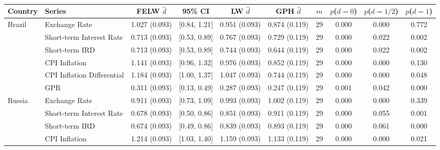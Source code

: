 \begin{table}[!htbp]
\fontsize{6}{7}\selectfont
\caption{}
\centering
\begin{adjustbox}{width=\textwidth}
\begin{tabular}{llcccccccc}
\hline
Country & Series & FELW $\hat{d}$ & 95\% CI & LW $\hat{d}$ & GPH $\hat{d}$ & $m$ & $p$($d=0$) & $p$($d=1/2$) & $p$($d=1$) \\ \hline
Brazil & Exchange Rate & 1.027 (0.093) & [0.84, 1.21] & 0.951 (0.093) & 0.874 (0.119) & 29 & 0.000 & 0.000 & 0.772 \\
 & Short-term Interest Rate & 0.713 (0.093) & [0.53, 0.89] & 0.767 (0.093) & 0.729 (0.119) & 29 & 0.000 & 0.022 & 0.002 \\
 & Short-term IRD & 0.713 (0.093) & [0.53, 0.89] & 0.744 (0.093) & 0.644 (0.119) & 29 & 0.000 & 0.022 & 0.002 \\
 & CPI Inflation & 1.141 (0.093) & [0.96, 1.32] & 0.976 (0.093) & 0.852 (0.119) & 29 & 0.000 & 0.000 & 0.130 \\
 & CPI Inflation Differential & 1.184 (0.093) & [1.00, 1.37] & 1.047 (0.093) & 0.744 (0.119) & 29 & 0.000 & 0.000 & 0.048 \\
 & GPR & 0.311 (0.093) & [0.13, 0.49] & 0.287 (0.093) & 0.247 (0.119) & 29 & 0.001 & 0.042 & 0.000 \\
\hline
Russia & Exchange Rate & 0.911 (0.093) & [0.73, 1.09] & 0.993 (0.093) & 1.002 (0.119) & 29 & 0.000 & 0.000 & 0.339 \\
 & Short-term Interest Rate & 0.678 (0.093) & [0.50, 0.86] & 0.851 (0.093) & 0.911 (0.119) & 29 & 0.000 & 0.055 & 0.001 \\
 & Short-term IRD & 0.674 (0.093) & [0.49, 0.86] & 0.839 (0.093) & 0.893 (0.119) & 29 & 0.000 & 0.061 & 0.000 \\
 & CPI Inflation & 1.214 (0.093) & [1.03, 1.40] & 1.159 (0.093) & 1.133 (0.119) & 29 & 0.000 & 0.000 & 0.021 \\

\end{tabular}
\end{adjustbox}
\end{table}
